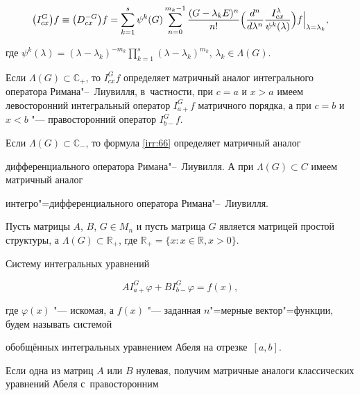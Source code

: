 \begin{equation}\label{irr:66}

\bigl(I^{G}_{cx}\bigr)f \equiv

\bigl(D^{-G}_{cx}\bigr)f=

\sum^{s}_{k=1}\psi^{k}(G)\sum^{m_{k}-1}_{n=0}\frac{(G-\lambda_{k}E)^{n}}{n!}\Bigl(\frac{d^{n}}{d\lambda^{n}}\frac{I^{\lambda}_{cx}}{\psi^{k}(\lambda)}\Bigr)f\Big|_{\lambda=\lambda_{k}},

\end{equation}

где $\psi^{k}(\lambda)=(\lambda-\lambda_{k})^{-m_{k}} \prod^{s}_{k=1}(\lambda-\lambda_{k})^{m_{k}}$, $\lambda_{k}\in

\Lambda(G)$.%



Если $\Lambda(G)\subset \mathbb C_{+}$, то $I^{G}_{cx}f$ определяет матричный аналог интегрального оператора Римана"--~Лиувилля, в~частности, при $c=a$ и $x>a$ имеем левосторонний интегральный оператор $I^{G}_{a+}f$ матричного порядка, а при $c=b$ и $x<b$ "--- правосторонний оператор $I^{G}_{b-}f$. 

Если $\Lambda(G)\subset \mathbb C_{-}$, то формула \eqref{irr:66} определяет матричный аналог

дифференциального оператора Римана"--~Лиувилля. А при $\Lambda(G)\subset C$ имеем матричный аналог

интегро"=дифференциального оператора Римана"--~Лиувилля.



Пусть матрицы $A$, $B$, $G\in M_{n}$ и пусть матрица $G$ является матрицей простой структуры, а $\Lambda(G)\subset \mathbb R_{+}$, где $\mathbb R_{+}=\{x:x\in \mathbb R, x>0\}$. 

Систему интегральных уравнений

\begin{equation}\label{irr:7}

AI^{G}_{a+}\varphi+BI^{G}_{b-}\varphi=f(x),

\end{equation}

где $\varphi(x)$ "--- искомая, а $f(x)$ "--- заданная $n$"=мерные вектор"=функции, будем называть системой

обобщённых интегральных уравнением Абеля на отрезке~$[a, b]$.



Если одна из матриц $A$ или $B$ нулевая, получим матричные аналоги классических уравнений Абеля с~правосторонним

